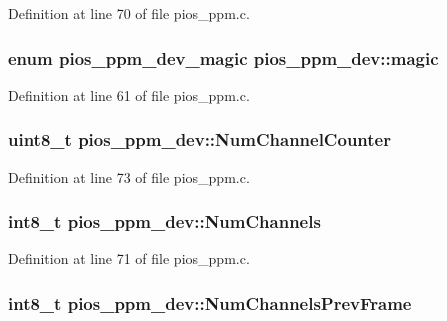 \-Definition at line 70 of file pios\-\_\-ppm.\-c.

\hypertarget{structpios__ppm__dev_a1e45b2498e0e64e13001774d17d95417}{
\subsubsection[{magic}]{\setlength{\rightskip}{0pt plus 5cm}enum {\bf pios\-\_\-ppm\-\_\-dev\-\_\-magic} {\bf pios\-\_\-ppm\-\_\-dev\-::magic}}}\label{structpios__ppm__dev_a1e45b2498e0e64e13001774d17d95417}


\-Definition at line 61 of file pios\-\_\-ppm.\-c.

\hypertarget{structpios__ppm__dev_aace8701f1500560123d6eccc8a5150c3}{
\subsubsection[{\-Num\-Channel\-Counter}]{\setlength{\rightskip}{0pt plus 5cm}uint8\-\_\-t {\bf pios\-\_\-ppm\-\_\-dev\-::\-Num\-Channel\-Counter}}}\label{structpios__ppm__dev_aace8701f1500560123d6eccc8a5150c3}


\-Definition at line 73 of file pios\-\_\-ppm.\-c.

\hypertarget{structpios__ppm__dev_ad22d6ba25b163e89459fa089bb3a3d45}{
\subsubsection[{\-Num\-Channels}]{\setlength{\rightskip}{0pt plus 5cm}int8\-\_\-t {\bf pios\-\_\-ppm\-\_\-dev\-::\-Num\-Channels}}}\label{structpios__ppm__dev_ad22d6ba25b163e89459fa089bb3a3d45}


\-Definition at line 71 of file pios\-\_\-ppm.\-c.

\hypertarget{structpios__ppm__dev_ac648f6b4bdf6793c422676689daaca77}{
\subsubsection[{\-Num\-Channels\-Prev\-Frame}]{\setlength{\rightskip}{0pt plus 5cm}int8\-\_\-t {\bf pios\-\_\-ppm\-\_\-dev\-::\-Num\-Channels\-Prev\-Frame}}}\label{structpios__ppm__dev_ac648f6b4bdf6793c422676689daaca77}


